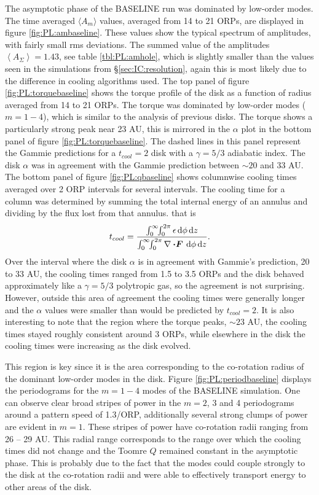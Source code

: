 The asymptotic phase of the BASELINE run was dominated by low-order modes. The time averaged $\langle A_m \rangle$ values, averaged from 14 to 21 ORPs, are displayed in figure \ref{fig:PL:ambaseline}. These values show the typical spectrum of amplitudes, with fairly small rms deviations. The summed value of the amplitudes $\left< A_\Sigma \right> = 1.43$, see table \ref{tbl:PL:amhole}, which is slightly smaller than the  values seen in the simulations from \S\ref{sec:IC:resolution}, again this is most likely due to the difference in cooling algorithms used.  The top panel of figure \ref{fig:PL:torquebaseline} shows the torque profile of the disk as a function of radius averaged from 14 to 21 ORPs. The torque was dominated by low-order modes ($m = 1-4$), which is similar to the analysis of previous disks. The torque shows a particularly strong peak near 23 AU, this is mirrored in the $\alpha$ plot in the bottom panel of figure \ref{fig:PL:torquebaseline}. The dashed lines in this panel represent the Gammie predictions for a $t_{cool} = 2$ disk with a $\gamma = 5/3$ adiabatic index. The disk $\alpha$ was in agreement with the Gammie prediction between $\sim\!20$ and 33 AU. The bottom panel of figure \ref{fig:PL:qbaseline} shows columnwise cooling times averaged over 2 ORP intervals for several intervals. The cooling time for a column was determined by summing the total internal energy of an annulus and dividing by the flux lost from that annulus. that is 
\begin{equation}
t_{cool} = \frac{\int_0^\infty\!\! \int_0^{2\pi} \epsilon \, \mathrm{d} \phi \,\mathrm{d} z}{\int_0^\infty \!\! \int_0^{2\pi} \nabla \boldsymbol{\cdot F} \, \mathrm{d}\phi\,\mathrm{d} z}.
\label{eq:PL:columncool}
\end{equation}
Over the interval where the disk $\alpha$ is in agreement with Gammie's prediction, 20 to 33 AU, the cooling times ranged from 1.5 to 3.5 ORPs and the disk behaved approximately like a $\gamma = 5/3$ polytropic gas, so the agreement is not surprising. However, outside this area of agreement the cooling times were generally longer and the $\alpha$ values were smaller than would be predicted by $t_{cool} =2$. It is also interesting to note that the region where the torque peaks, $\sim\!23$ AU, the cooling times stayed roughly consistent around 3 ORPs, while elsewhere in the disk the cooling times were increasing as the disk evolved.

This region is key since it is the area corresponding to the co-rotation radius of the dominant low-order modes in the disk. Figure \ref{fig:PL:periodbaseline} displays the periodograms for the $m=1-4$ modes of the BASELINE simulation. One can observe clear broad stripes of power in the $m = 2$, 3 and 4 periodograms around a pattern speed of 1.3/ORP, additionally several strong clumps of power are evident in $m=1$. These stripes of power have co-rotation radii ranging from 26 -- 29 AU. This radial range corresponds to the range over which the cooling times did not change and the Toomre $Q$ remained constant in the asymptotic phase. This is probably due to the fact that the modes could couple strongly to the disk at the co-rotation radii and were able to effectively transport energy to other areas of the disk.

